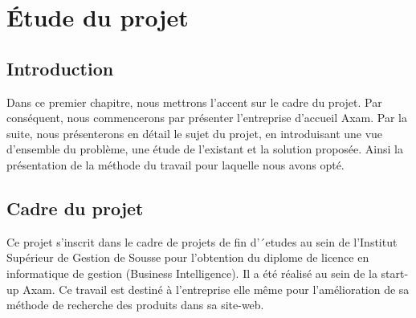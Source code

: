 \renewcommand\labelitemii{$\m\bullet$}
\section{Étude du projet}

\subsection{Introduction}
\noindent
Dans ce premier chapitre, nous mettrons l’accent sur le cadre du projet. Par conséquent, nous commencerons par présenter l’entreprise d’accueil Axam. Par la suite, nous présenterons en détail le sujet du projet, en introduisant une vue d’ensemble du problème, une étude de l’existant et la solution proposée. Ainsi la présentation de la méthode du travail pour laquelle nous avons opté.

\subsection{Cadre du projet}
\noindent
Ce projet s’inscrit dans le cadre de projets de fin d’´etudes au sein de l’Institut Supérieur de Gestion de Sousse pour l’obtention du diplome de
licence en informatique de gestion (Business Intelligence). Il a été réalisé au sein de la start-up Axam. Ce travail est destiné à l'entreprise elle même pour l'amélioration de sa méthode de recherche des produits dans sa site-web.








